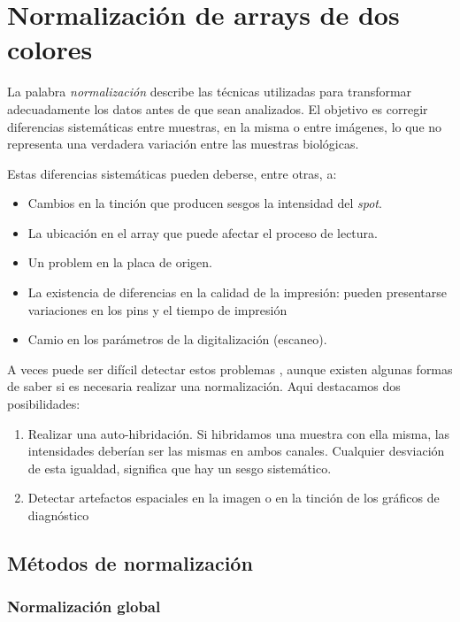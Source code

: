 \section{Normalizaci\'on de arrays de dos colores}
La palabra \emph{normalizaci\'on} describe las t\'ecnicas utilizadas para transformar adecuadamente los datos antes de que sean analizados.
El objetivo es corregir diferencias sistem\'aticas entre muestras, en la misma o entre im\'agenes, lo que no representa
una verdadera variaci\'on entre las muestras biol\'ogicas.

Estas  diferencias sistem\'aticas pueden deberse, entre otras, a:
\begin{itemize}
 \item Cambios en la tinci\'on que producen sesgos  la intensidad del \emph{spot}.
\item La ubicaci\'on en el array que puede afectar el proceso de lectura. 
\item Un problem en la placa de origen.
\item La existencia de diferencias en la calidad de la impresi\'on: pueden presentarse  variaciones en  los pins y el tiempo de impresi\'on
\item Camio en los par\'ametros de la digitalizaci\'on (escaneo).
\end{itemize}

A veces puede ser dif\'icil detectar estos problemas , aunque existen algunas  formas de saber  si es necesaria realizar una normalizaci\'on. Aqui destacamos dos posibilidades:
\begin{enumerate}
\item Realizar una auto-hibridaci\'on.
Si hibridamos una muestra con ella misma, las intensidades deber\'ian ser las mismas en ambos canales.
Cualquier desviaci\'on de esta igualdad, significa que hay un sesgo sistem\'atico.

\item Detectar artefactos espaciales en la imagen o en la tinci\'on de los gr\'aficos
de diagn\'ostico

\end{enumerate}
\subsection{M\'etodos de normalizaci\'on}


\subsubsection{\textbf{Normalizaci\'on global}}

